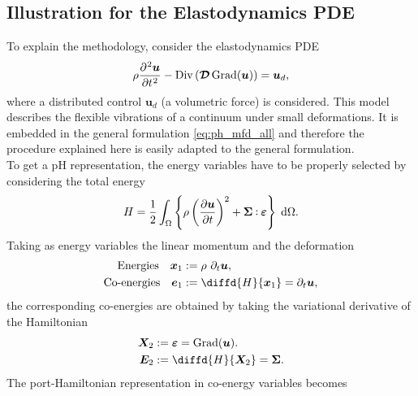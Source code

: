 \documentclass{svjour3}                     %
\DeclareMathOperator*{\Grad}{Grad}
\DeclareMathOperator*{\Div}{Div}
\def\onedot{$\mathsurround0pt\ldotp$}
\def\cddot{%
	\mathbin{\vcenter{\baselineskip.67ex
			\hbox{\onedot}\hbox{\onedot}}%
}}
\begin{document}
\subsection{Illustration for the Elastodynamics PDE}
To explain the methodology, consider the elastodynamics PDE
\begin{equation*}
\rho \diffp[2]{\bm{u}}{t} - \Div\left(\bm{\mathcal{D}} \Grad(\bm{u})\right) = \bm{u}_d,
\end{equation*}
where a distributed control $\bm{u}_d$ (a volumetric force) is considered. This model describes the flexible vibrations of a continuum under small deformations. It is embedded in the general formulation \eqref{eq:ph_mfd_all} and therefore the procedure explained here is easily adapted to the general formulation. \\
To get a pH representation, the energy variables have to be properly selected by considering the total energy
\begin{equation}
\label{eq:en_eldyn}
\displaystyle H = \frac{1}{2} \int_{\Omega} \left\{\rho \left(\diffp{\bm{u}}{t}\right)^2 + \bm\Sigma \cddot \bm\varepsilon \right\} \d{\Omega}.
\end{equation}
Taking as energy variables the linear momentum and the deformation
\begin{equation}
\begin{aligned}
\text{Energies} \quad  \bm{x}_1 &:= \rho \ \partial_t \bm{u}, \\
\text{Co-energies} \quad \bm{e}_1 &:= \diffd{H}{\bm{x}_1} =  \partial_t \bm{u}, \\
\end{aligned} 
\end{equation}
the corresponding co-energies are obtained by taking the variational derivative of the Hamiltonian
\begin{equation}
\begin{aligned}
\bm{X}_2 &:= \bm\varepsilon = \Grad(\bm{u}). \\
\bm{E}_2 &:= \diffd{H}{\bm{X}_2} = \bm\Sigma.
\end{aligned}
\end{equation}
The port-Hamiltonian representation in co-energy variables becomes
\end{document}
